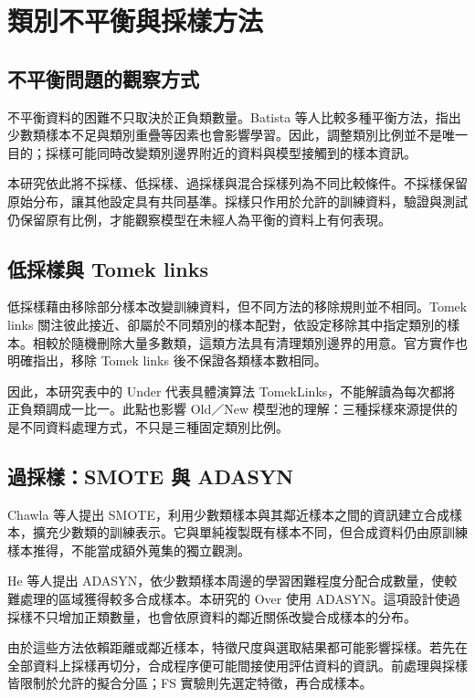 \section{類別不平衡與採樣方法}

\subsection{不平衡問題的觀察方式}

不平衡資料的困難不只取決於正負類數量。Batista 等人\autocite{batista2004balancing}比較多種平衡方法，指出少數類樣本不足與類別重疊等因素也會影響學習。因此，調整類別比例並不是唯一目的；採樣可能同時改變類別邊界附近的資料與模型接觸到的樣本資訊。

本研究依此將不採樣、低採樣、過採樣與混合採樣列為不同比較條件。不採樣保留原始分布，讓其他設定具有共同基準。採樣只作用於允許的訓練資料，驗證與測試仍保留原有比例，才能觀察模型在未經人為平衡的資料上有何表現。

\subsection{低採樣與 Tomek links}

低採樣藉由移除部分樣本改變訓練資料，但不同方法的移除規則並不相同。Tomek links 關注彼此接近、卻屬於不同類別的樣本配對，依設定移除其中指定類別的樣本。相較於隨機刪除大量多數類，這類方法具有清理類別邊界的用意。官方實作也明確指出，移除 Tomek links 後不保證各類樣本數相同\autocite{imblearn-tomek-docs}。

因此，本研究表中的 Under 代表具體演算法 TomekLinks，不能解讀為每次都將正負類調成一比一。此點也影響 Old／New 模型池的理解：三種採樣來源提供的是不同資料處理方式，不只是三種固定類別比例。

\subsection{過採樣：SMOTE 與 ADASYN}

Chawla 等人\autocite{chawla2002smote}提出 SMOTE，利用少數類樣本與其鄰近樣本之間的資訊建立合成樣本，擴充少數類的訓練表示。它與單純複製既有樣本不同，但合成資料仍由原訓練樣本推得，不能當成額外蒐集的獨立觀測。

He 等人\autocite{he2008adasyn}提出 ADASYN，依少數類樣本周邊的學習困難程度分配合成數量，使較難處理的區域獲得較多合成樣本。本研究的 Over 使用 ADASYN。這項設計使過採樣不只增加正類數量，也會依原資料的鄰近關係改變合成樣本的分布。

由於這些方法依賴距離或鄰近樣本，特徵尺度與選取結果都可能影響採樣。若先在全部資料上採樣再切分，合成程序便可能間接使用評估資料的資訊。前處理與採樣皆限制於允許的擬合分區；FS 實驗則先選定特徵，再合成樣本。

